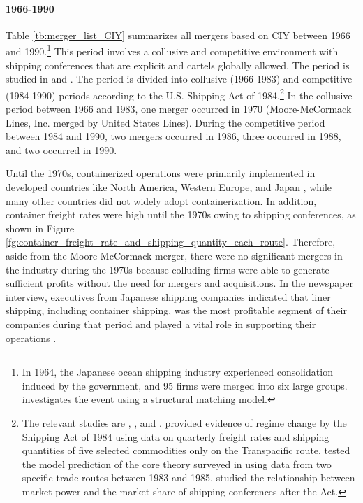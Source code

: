 \documentclass[10pt]{article}
\begin{document}
\paragraph{1966-1990} 

Table \ref{tb:merger_list_CIY} summarizes all mergers based on CIY between 1966 and 1990.\footnote{In 1964, the Japanese ocean shipping industry experienced consolidation induced by the government, and 95 firms were merged into six large groups. \cite{otani2021estimating} investigates the event using a structural matching model.}
This period involves a collusive and competitive environment with shipping conferences that are explicit and cartels globally allowed. 
The period is studied in \cite{matsuda2022unified} and \cite{otani2023industry}.
The period is divided into collusive (1966-1983) and competitive (1984-1990) periods according to the U.S. Shipping Act of 1984.\footnote{The relevant studies are \cite{wilson1991some}, \cite{pirrong1992application}, and \cite{clyde1998market}. \cite{wilson1991some} provided evidence of regime change by the Shipping Act of 1984 using data on quarterly freight rates and shipping quantities of five selected commodities only on the Transpacific route. \cite{pirrong1992application} tested the model prediction of the core theory surveyed in \cite{sjostrom2013competition} using data from two specific trade routes between 1983 and 1985. \cite{clyde1998market} studied the relationship between market power and the market share of shipping conferences after the Act. }
In the collusive period between 1966 and 1983, one merger occurred in 1970 (Moore-McCormack Lines, Inc. merged by United States Lines). %
During the competitive period between 1984 and 1990, two mergers occurred in 1986, three occurred in 1988, and two occurred in 1990. 

Until the 1970s, containerized operations were primarily implemented in developed countries like North America, Western Europe, and Japan \citep{GUERRERO2014151}, while many other countries did not widely adopt containerization.
In addition, container freight rates were high until the 1970s owing to shipping conferences, as shown in Figure \ref{fg:container_freight_rate_and_shipping_quantity_each_route}.
Therefore, aside from the Moore-McCormack merger, there were no significant mergers in the industry during the 1970s because colluding firms were able to generate sufficient profits without the need for mergers and acquisitions. In the newspaper interview, executives from Japanese shipping companies indicated that liner shipping, including container shipping, was the most profitable segment of their companies during that period and played a vital role in supporting their operations \citep{sato2006}.
\end{document}

